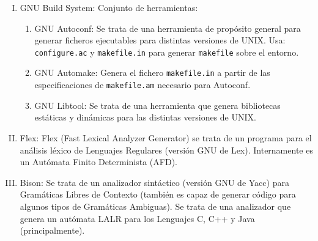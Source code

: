 \begin{enumerate}[I.]
\item GNU Build System: Conjunto de herramientas:

\begin{enumerate}[i]

\item GNU Autoconf: Se trata de una herramienta de propósito general para 
generar ficheros ejecutables para distintas versiones de UNIX. Usa: 
\texttt{configure.ac} y \texttt{makefile.in} para generar \texttt{makefile} 
sobre el entorno.

\item GNU Automake: Genera el fichero \texttt{makefile.in} a partir de las 
especificaciones de \texttt{makefile.am} necesario para Autoconf.

\item GNU Libtool: Se trata de una herramienta que genera bibliotecas estáticas 
y dinámicas para las distintas versiones de UNIX.

\end{enumerate}

\item Flex: Flex (Fast Lexical Analyzer Generator) se trata de un programa para 
el análisis léxico de Lenguajes Regulares (versión GNU de Lex). Internamente es 
un Autómata Finito Determinista (AFD).

\item Bison: Se trata de un analizador sintáctico (versión GNU de Yacc) para 
Gramáticas Libres de Contexto (también es capaz de generar código para algunos 
tipos de Gramáticas Ambiguas). Se trata de una analizador que genera un autómata LALR para los Lenguajes C, C++ y Java (principalmente).


\end{enumerate}

